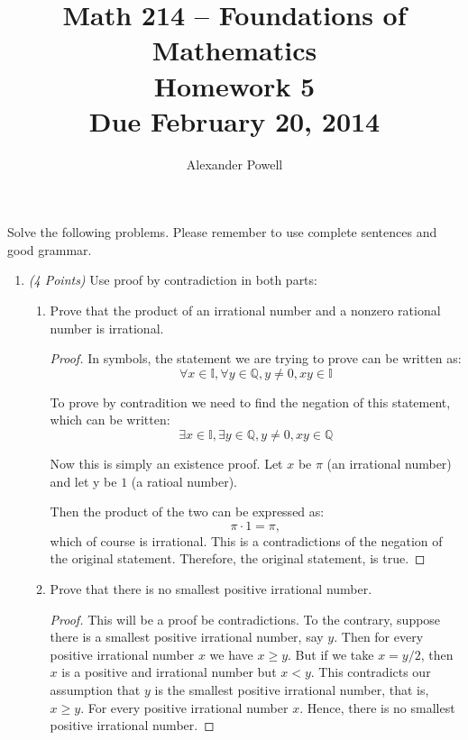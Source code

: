 \documentclass[10pt]{article} %
\title{Math 214 -- Foundations of Mathematics\\
Homework 5\\
{\large{\bf Due February 20, 2014}}}
\date{}
\author{Alexander Powell}
\newcommand{\points}[1]{{\it (#1 Points)}}
\begin{document}
\maketitle

Solve the following problems.  Please remember to use complete sentences
and good grammar.

\begin{enumerate}



\item \points{4} Use proof by contradiction in both parts:

\begin{enumerate}
  \item Prove that the product of an irrational number and a nonzero rational number is irrational.
  
  \bigskip
  
  \begin{proof} In symbols, the statement we are trying to prove can be written as:
  $$\forall x \in \mathbb{I}, \forall y \in \mathbb{Q}, y \not = 0, xy \in \mathbb{I}$$
  
  To prove by contradition we need to find the negation of this statement, which can be written:
  $$\exists x \in \mathbb{I}, \exists y \in \mathbb{Q}, y \not = 0, xy \in \mathbb{Q}$$
  
  Now this is simply an existence proof.  Let $x$ be $\pi$ (an irrational number) and let y be $1$ (a ratioal number).  
  
  Then the product of the two can be expressed as:
  $$\pi \cdot 1 = \pi,$$ which of course is irrational.  This is a contradictions of the negation of the original statement.  Therefore, the original statement, is true.  
  \end{proof}
  
  \bigskip
  
  \item Prove that there is no smallest positive irrational number.
  
  \bigskip
  
  \begin{proof} This will be a proof be contradictions.  To the contrary, suppose there is a smallest positive irrational number, say $y$.  Then for every positive irrational number $x$ we have $x \geq y$.  But if we take $x = y/2$, then $x$ is a positive and irrational number but $x < y$.  This contradicts our assumption that $y$ is the smallest positive irrational number, that is, $x \geq y$.  For every positive irrational number $x$.  Hence, there is no smallest positive  irrational number.  
  \end{proof}
  

\end{enumerate}
\end{enumerate}
\end{document}
